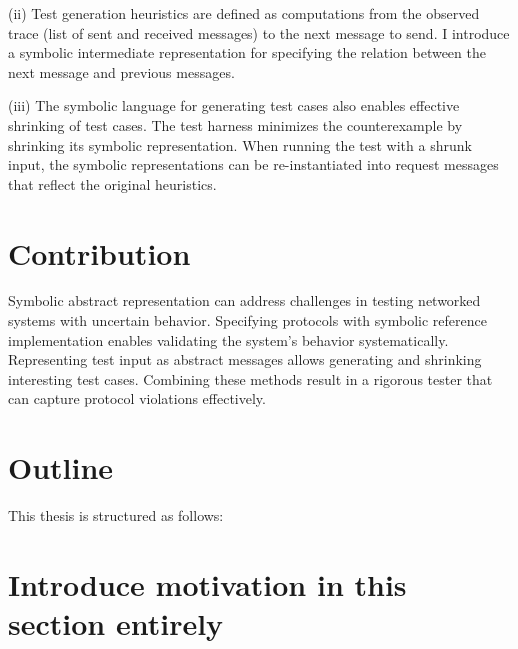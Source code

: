 (ii) Test generation heuristics are defined as computations from the observed
trace (list of sent and received messages) to the next message to send.  I
introduce a symbolic intermediate representation for specifying the relation
between the next message and previous messages.

(iii) The symbolic language for generating test cases also enables effective
shrinking of test cases.  The test harness minimizes the counterexample by
shrinking its symbolic representation.  When running the test with a shrunk
input, the symbolic representations can be re-instantiated into request messages
that reflect the original heuristics.

\section{Contribution}
Symbolic abstract representation can address challenges in testing networked systems with uncertain behavior.
Specifying protocols with symbolic reference implementation enables validating
the system's behavior systematically.  Representing test input as abstract
messages allows generating and shrinking interesting test cases.  Combining
these methods result in a rigorous tester that can capture protocol violations
effectively.

\section{Outline}
This thesis is structured as follows:

\section{Introduce motivation in this section entirely}

